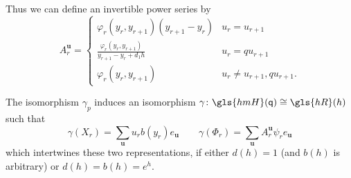 \documentclass[ALCO,ThmDefs,Unicode,epreuves]{cedram}
\newcommand{\pq}{\mathsf{q}}
\newcommand{\Bu}{\mathbf{u}}
\newcommand{\hmH}{\gls{hmH}}
\newcommand{\hR}{\gls{hR}}
\begin{document}
Thus we can define an invertible power series by \[A^{\Bu}_{r}=
\begin{cases}
 \displaystyle
\varphi_r(y_r,y_{r+1})(y_{r+1} -y_r)
& u_r =u_{r+1}\\
 \displaystyle \frac{\varphi_r(y_r,y_{r+1})}{y_{r+1}-y_r+d_1h}&
 u_r=qu_{r+1}\\
 \displaystyle \varphi_r(y_r,y_{r+1})&
 u_r\neq u_{r+1}, qu_{r+1}.
\end{cases}
\]

\begin{theorem}\label{O-isomorphism}
 The isomorphism $\gamma_p$ induces an isomorphism $\gamma\colon \hmH(\pq)\cong
 \hR(h)$ such that \[\gamma(X_r)=\sum_{\Bu}u_rb(y_r)e_{\Bu} \qquad \gamma(\Phi_r)=\sum_{\Bu}
 A_r^{\Bu}\psi_re_{\Bu}\]
 which intertwines these two representations, if either $d(h)=1$ (and
 $b(h)$ is arbitrary) or 
 $d(h)=b(h)=e^h$.
\end{theorem}
\end{document}
